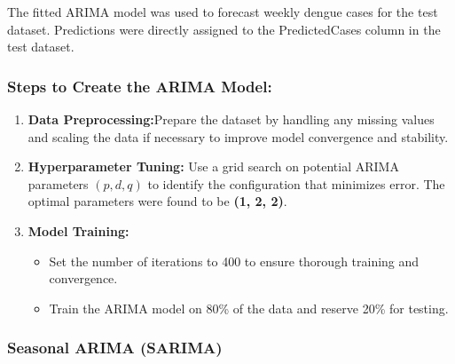 The fitted ARIMA model was used to forecast weekly dengue cases for the test dataset. Predictions were directly assigned to the PredictedCases column in the test dataset.

\subsubsection{Steps to Create the ARIMA Model:}
\begin{enumerate}
	\item \textbf{Data Preprocessing:}Prepare the dataset by handling any missing values and scaling the data if necessary to improve model convergence and stability.

\item \textbf{Hyperparameter Tuning:}  
Use a grid search on potential ARIMA parameters $(p, d, q)$ to identify the configuration that minimizes error. The optimal parameters were found to be \textbf{(1, 2, 2)}.

\item \textbf{Model Training:}
\begin{itemize}
	\item Set the number of iterations to 400 to ensure thorough training and convergence.
	\item Train the ARIMA model on 80\% of the data and reserve 20\% for testing.
\end{itemize}
\end{enumerate}


\subsubsection{Seasonal ARIMA (SARIMA)}

